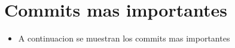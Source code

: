 \section{Commits mas importantes}
\begin{itemize}
  \item A continuacion se muestran los commits mas importantes
\end{itemize}


    \begin{lstlisting}[language=bash, caption={commits mas importantes}]
    \end{lstlisting}
